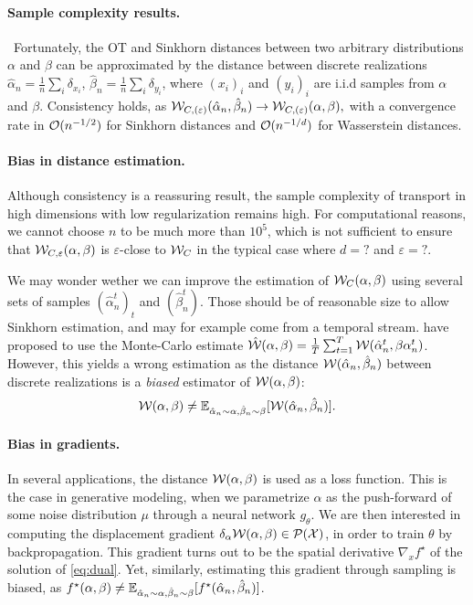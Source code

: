 \paragraph{Sample complexity results.}  Fortunately, the OT and Sinkhorn distances between two arbitrary distributions
$\alpha$ and $\beta$ can be approximated by the distance between discrete
realizations $\hat \alpha_n = \frac{1}{n} \sum_i \delta_{x_i}$, 
$\hat \beta_n = \frac{1}{n} \sum_i \delta_{y_i}$, where $(x_i)_i$
and $(y_i)_i$ are i.i.d samples from $\alpha$ and $\beta$. Consistency holds, as
$\mathcal{W}_{C, (\varepsilon)}(\hat \alpha_n, \hat \beta_n) \to \mathcal{W}_{C, (\varepsilon)}(\alpha, \beta),$
with a convergence rate in $\mathcal{O}(n^{-1/2})$ for Sinkhorn distances and $\mathcal{O}(n^{-1/d})$ for
Wasserstein distances.

\paragraph{Bias in distance estimation.} Although consistency is a reassuring result, the
sample complexity of transport in high dimensions with low regularization
remains high. For computational reasons, we cannot choose $n$ to be much more
than $10^5$, which is not sufficient to ensure that $\mathcal{W}_{C,\varepsilon}(\alpha,
\beta)$ is $\varepsilon$-close to $\mathcal{W}_C$ in the typical case where $d=?$ and
$\varepsilon = ?$.

We may wonder wether we can improve the estimation of $\mathcal{W}_{C}(\alpha,\beta)$
using several sets of samples $(\hat \alpha_n^t)_t$ and $(\hat \beta_n^t)$. Those should be of 
reasonable size to allow Sinkhorn estimation, and may for example come from a temporal stream. \cite{}\cite{} have proposed to use 
the Monte-Carlo estimate $\hat {\mathcal{W}}(\alpha, \beta) = \frac{1}{T} \sum_{t=1}^T
\mathcal{W}(\hat \alpha_n^t, \beta \alpha_n^t)$. However, this yields a wrong estimation
as the distance $\mathcal{W}(\hat \alpha_n, \hat \beta_n)$ between discrete realizations
is a \textit{biased} estimator of $\mathcal{W}(\alpha, \beta)$:
\begin{equation}
    \mathcal{W}(\alpha, \beta) \neq 
    \mathbb{E}_{\hat \alpha_n \sim \alpha, \hat \beta_n \sim \beta} [\mathcal{W}(\hat \alpha_n, \hat \beta_n)].
\end{equation}

\paragraph{Bias in gradients.} In several applications, the distance
$\mathcal{W}(\alpha, \beta)$ is used as a loss function. This is the case in generative
modeling, when we parametrize $\alpha$ as the push-forward of some noise
distribution $\mu$ through a neural network $g_\theta$. We are then interested
in computing the displacement gradient $\delta_\alpha \mathcal{W}(\alpha, \beta) \in
\mathcal{P}(\mathcal{X})$, in order to train $\theta$ by backpropagation. This gradient turns
out to be the spatial derivative $\nabla_x f^\star$ of the solution of
\eqref{eq:dual}. Yet, similarly, estimating this gradient through sampling is
biased, as $f^\star(\alpha, \beta) \neq \mathbb{E}_{\hat \alpha_n \sim \alpha, \hat
\beta_n \sim \beta}[f^\star(\hat \alpha_n, \hat \beta_n)]$.

\hfill